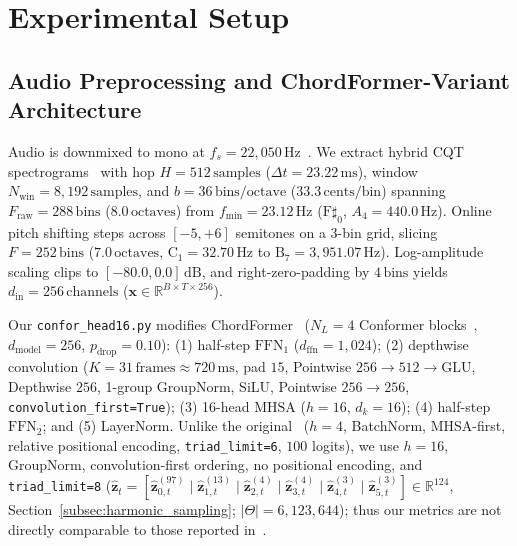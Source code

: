 \section{Experimental Setup}\label{sec:experiments}

\subsection{Audio Preprocessing and ChordFormer-Variant Architecture}\label{subsec:preprocessing_arch}

Audio is downmixed to mono at $f_s = 22{,}050\,\text{Hz}$~\cite{akram2026chordformer}. We extract hybrid CQT spectrograms~\cite{brown1991calculation} with hop $H = 512\,\text{samples}$ ($\Delta t = 23.22\,\text{ms}$), window $N_{\text{win}} = 8{,}192\,\text{samples}$, and $b = 36\,\text{bins/octave}$ ($33.3\,\text{cents/bin}$) spanning $F_{\text{raw}} = 288\,\text{bins}$ ($8.0\,\text{octaves}$) from $f_{\min} = 23.12\,\text{Hz}$ ($\text{F}\sharp_0$, $A_4 = 440.0\,\text{Hz}$). Online pitch shifting steps across $[-5, +6]$ semitones on a $3$-bin grid, slicing $F = 252\,\text{bins}$ ($7.0\,\text{octaves}$, $\text{C}_1 = 32.70\,\text{Hz}$ to $\text{B}_7 = 3{,}951.07\,\text{Hz}$). Log-amplitude scaling clips to $[-80.0, 0.0]\,\text{dB}$, and right-zero-padding by $4\,\text{bins}$ yields $d_{\text{in}} = 256\,\text{channels}$ ($\mathbf{x} \in \mathbb{R}^{B \times T \times 256}$).

Our {\small\texttt{confor\_head16.py}} modifies ChordFormer~\cite{akram2026chordformer} ($N_L = 4$ Conformer blocks~\cite{gulati2020conformer}, $d_{\text{model}} = 256$, $p_{\text{drop}} = 0.10$): (1) half-step $\text{FFN}_1$ ($d_{\text{ffn}} = 1{,}024$); (2) depthwise convolution ($K = 31\,\text{frames} \approx 720\,\text{ms}$, pad $15$, Pointwise $256 \!\to\! 512 \!\to\! \text{GLU}$, Depthwise $256$, 1-group GroupNorm, SiLU, Pointwise $256 \!\to\! 256$, {\small\texttt{convolution\_first=True}}); (3) 16-head $\text{MHSA}$ ($h = 16$, $d_k = 16$); (4) half-step $\text{FFN}_2$; and (5) LayerNorm. Unlike the original~\cite{akram2026chordformer} ($h = 4$, BatchNorm, MHSA-first, relative positional encoding, {\small\texttt{triad\_limit=6}}, $100$ logits), we use $h = 16$, GroupNorm, convolution-first ordering, no positional encoding, and {\small\texttt{triad\_limit=8}} ($\hat{\mathbf{z}}_t = [\hat{\mathbf{z}}_{0,t}^{(97)} \mid \hat{\mathbf{z}}_{1,t}^{(13)} \mid \hat{\mathbf{z}}_{2,t}^{(4)} \mid \hat{\mathbf{z}}_{3,t}^{(4)} \mid \hat{\mathbf{z}}_{4,t}^{(3)} \mid \hat{\mathbf{z}}_{5,t}^{(3)}] \in \mathbb{R}^{124}$, Section~\ref{subsec:harmonic_sampling}; $|\Theta| = 6{,}123{,}644$); thus our metrics are not directly comparable to those reported in~\cite{akram2026chordformer}.


